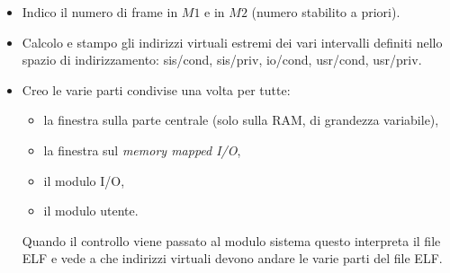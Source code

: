 \begin{itemize}
\begin{center}
	\end{center}
	\begin{itemize}
		\item Indico il numero di frame in $M1$ e in $M2$ (numero stabilito a priori).
		\item Calcolo e stampo gli indirizzi virtuali estremi dei vari intervalli definiti nello spazio di indirizzamento: sis/cond, sis/priv, io/cond, usr/cond, usr/priv.
		\item Creo le varie parti condivise una volta per tutte: 
		\begin{itemize}
			\item la finestra sulla parte centrale (solo sulla RAM, di grandezza variabile),
			\item la finestra sul \emph{memory mapped I/O},
			\item il modulo I/O,
			\item il modulo utente.
		\end{itemize}
		Quando il controllo viene passato al modulo sistema questo interpreta il file ELF e vede a che indirizzi virtuali devono andare le varie parti del file ELF.
	\end{itemize}
\end{itemize} 